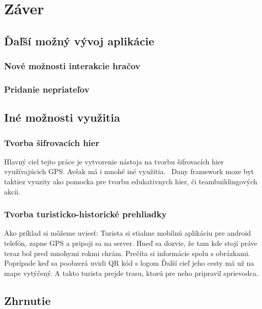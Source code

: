 \chapter{Záver}
\section{Ďaľší možný vývoj aplikácie}
\subsection{Nové možnosti interakcie hračov}
\subsection{Pridanie nepriateľov}


\section{Iné možnosti využitia}
\subsection{Tvorba šifrovacích hier}
Hlavný ciel tejto práce je vytvorenie nástoja na tvorbu šifrovacích hier využívajúcich GPS. Avšak má i mnohé iné využitia. \
Dany framework moze byt taktiez vyuzity ako pomocka pre tvorbu edukativnych hier, či teambuildingových akcii. 

\subsection{Tvorba turisticko-historické prehliadky}
Ako príklad si môžeme uviesť: Turista si stiahne mobilnú aplikáciu pre android telefón, zapne GPS a pripoji sa na server. Hneď sa dozvie, že tam kde stojí práve teraz bol pred mnohymi rokmi chrám. Prečíta si informácie spolu s obrázkami. Poprípade keď sa poobzerá uvidi QR kód s logom Ďalší cieľ jeho cesty má už na mape vytýčený. A takto turista prejde trasu, ktorú pre neho pripravil sprievodca. 

\section{Zhrnutie}